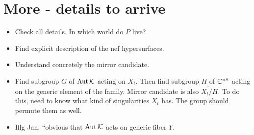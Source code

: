 \documentclass[11pt, english]{article}
\begin{document}
\section{More - details to arrive}

\begin{itemize}
\item Check all details. In which world do $P$ live?
\item Find explicit description of the nef hypersurfaces.
\item Understand concretely the mirror candidate. 
\item Find subgroup $G$ of $\operatorname{Aut} \mathcal K$ acting on $X_t$. Then find subgroup $H$ of ${\mathbb{C}^\ast} ^n$ acting on the generic element of the family. Mirror candidate is also $\widetilde{X_t/H}$. To do this, need to know what kind of singularities $X_t$ has. The group should permute them as well. 
\item Iflg Jan, ``obvious that $\operatorname{Aut} \mathcal K$ acts on generic fiber $Y$.
\end{itemize}

 

\end{document}

